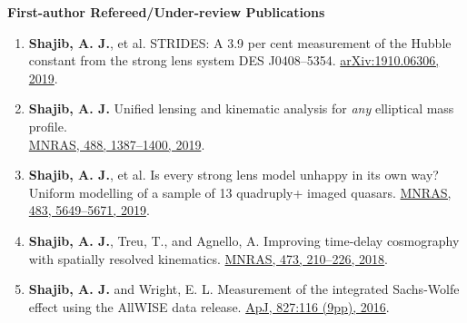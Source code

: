 \documentclass[11pt]{article}
\begin{document}

\textbf{First-author Refereed/Under-review Publications}
\begin{enumerate}
	\item \textbf{Shajib, A. J.}, et al. STRIDES: A 3.9 per cent measurement of the Hubble constant from the strong lens system DES J0408--5354. \href{https://arxiv.org/abs/1910.06306}{arXiv:1910.06306, 2019}.
	\item \textbf{Shajib, A. J.} Unified lensing and kinematic analysis for \textit{any} elliptical mass profile. \\ \href{https://doi.org/10.1093/mnras/stz1796}{MNRAS, 488, 1387--1400, 2019}.
	\item \textbf{Shajib, A. J.}, et al. Is every strong lens model unhappy in its own way? Uniform modelling of a sample of 13 quadruply+ imaged quasars. \href{https://doi.org/10.1093/mnras/sty3397}{MNRAS, 483, 5649--5671, 2019}.
	\item \textbf{Shajib, A. J.}, Treu, T., and Agnello, A. Improving time-delay cosmography with spatially resolved kinematics. \href{https://doi.org/10.1093/mnras/stx2302}{MNRAS, 473, 210--226, 2018}.
	\item \textbf{Shajib, A. J.} and Wright, E. L. Measurement of the integrated Sachs-Wolfe effect using the AllWISE data release. \href{http://dx.doi.org/10.3847/0004-637X/827/2/116}{ApJ, 827:116 (9pp), 2016}.
\end{enumerate}
\end{document}

